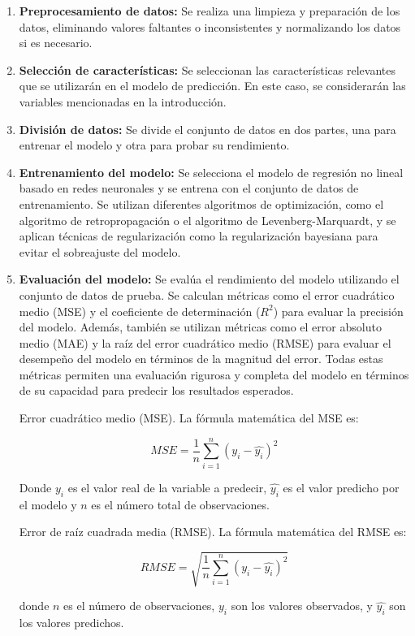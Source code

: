 \documentclass{article}
\begin{document}
\begin{enumerate}
\item \textbf{Preprocesamiento de datos:} Se realiza una limpieza y preparación de los datos, eliminando valores faltantes o inconsistentes y normalizando los datos si es necesario.
\item \textbf{Selección de características:} Se seleccionan las características relevantes que se utilizarán en el modelo de predicción. En este caso, se considerarán las variables mencionadas en la introducción.
\item \textbf{División de datos:} Se divide el conjunto de datos en dos partes, una para entrenar el modelo y otra para probar su rendimiento.
\item \textbf{Entrenamiento del modelo:} Se selecciona el modelo de regresión no lineal basado en redes neuronales y se entrena con el conjunto de datos de entrenamiento. Se utilizan diferentes algoritmos de optimización, como el algoritmo de retropropagación o el algoritmo de Levenberg-Marquardt, y se aplican técnicas de regularización como la regularización bayesiana para evitar el sobreajuste del modelo.
\item \textbf{Evaluación del modelo:} Se evalúa el rendimiento del modelo utilizando el conjunto de datos de prueba. Se calculan métricas como el error cuadrático medio (MSE) y el coeficiente de determinación ($R^2$) para evaluar la precisión del modelo. Además, también se utilizan métricas como el error absoluto medio (MAE) y la raíz del error cuadrático medio (RMSE) para evaluar el desempeño del modelo en términos de la magnitud del error. Todas estas métricas permiten una evaluación rigurosa y completa del modelo en términos de su capacidad para predecir los resultados esperados.

Error cuadrático medio (MSE).
La fórmula matemática del MSE es:

$$MSE = \frac{1}{n} \sum_{i=1}^{n}(y_i - \hat{y_i})^2$$

Donde $y_i$ es el valor real de la variable a predecir, $\hat{y_i}$ es el valor predicho por el modelo y $n$ es el número total de observaciones.

Error de raíz cuadrada media (RMSE). La fórmula matemática del RMSE es:

$$RMSE = \sqrt{\frac{1}{n}\sum_{i=1}^n (y_i - \hat{y_i})^2}$$

donde $n$ es el número de observaciones, $y_i$ son los valores observados, y $\hat{y_i}$ son los valores predichos.


\end{enumerate}
\end{document}
